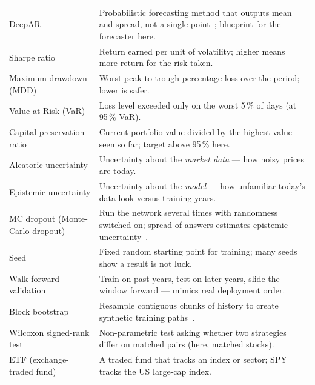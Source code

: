 \begin{longtable}{p{4.2cm} p{10cm}}
\addlinespace
DeepAR & Probabilistic forecasting method that outputs mean and spread, not a single point~\parencite{salinas2020deepar}; blueprint for the forecaster here. \\
\addlinespace
Sharpe ratio & Return earned per unit of volatility; higher means more return for the risk taken. \\
\addlinespace
Maximum drawdown (MDD) & Worst peak-to-trough percentage loss over the period; lower is safer. \\
\addlinespace
Value-at-Risk (VaR) & Loss level exceeded only on the worst 5\,\% of days (at 95\,\% VaR). \\
\addlinespace
Capital-preservation ratio & Current portfolio value divided by the highest value seen so far; target above 95\,\% here. \\
\addlinespace
Aleatoric uncertainty & Uncertainty about the \emph{market data} --- how noisy prices are today. \\
\addlinespace
Epistemic uncertainty & Uncertainty about the \emph{model} --- how unfamiliar today's data look versus training years. \\
\addlinespace
MC dropout (Monte-Carlo dropout) & Run the network several times with randomness switched on; spread of answers estimates epistemic uncertainty~\parencite{gal2016dropout}. \\
\addlinespace
Seed & Fixed random starting point for training; many seeds show a result is not luck. \\
\addlinespace
Walk-forward validation & Train on past years, test on later years, slide the window forward --- mimics real deployment order. \\
\addlinespace
Block bootstrap & Resample contiguous chunks of history to create synthetic training paths~\parencite{politis1994stationary}. \\
\addlinespace
Wilcoxon signed-rank test & Non-parametric test asking whether two strategies differ on matched pairs (here, matched stocks). \\
\addlinespace
ETF (exchange-traded fund) & A traded fund that tracks an index or sector; SPY tracks the US large-cap index. \\
\end{longtable}
